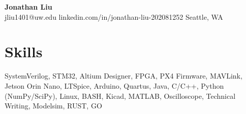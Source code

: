 \documentclass[11pt,letterpaper]{article}
\begin{document}
\begin{center}
{\LARGE \textbf{Jonathan Liu}}\\[2pt]
\small jliu1401@uw.edu \textbullet{} linkedin.com/in/jonathan-liu-202081252 \textbullet{} Seattle, WA
\end{center}
\section*{Skills}
SystemVerilog, STM32, Altium Designer, FPGA, PX4 Firmware, MAVLink, Jetson Orin Nano, LTSpice, Arduino, Quartus, Java, C/C++, Python (NumPy/SciPy), Linux, BASH, Kicad, MATLAB, Oscilloscope, Technical Writing, Modelsim, RUST, GO
\end{document}
